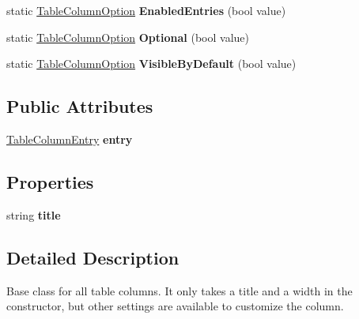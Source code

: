 \begin{DoxyCompactItemize}
\item 
\mbox{\label{class_editor_g_u_i_table_1_1_table_column_a86d1eda120806f1b74c25e01debcd65e}} 
static \mbox{\hyperlink{class_table_column_option}{Table\+Column\+Option}} {\bfseries Enabled\+Entries} (bool value)
\item 
\mbox{\label{class_editor_g_u_i_table_1_1_table_column_ade101144654dfd6c42c5da8b3aa4f633}} 
static \mbox{\hyperlink{class_table_column_option}{Table\+Column\+Option}} {\bfseries Optional} (bool value)
\item 
\mbox{\label{class_editor_g_u_i_table_1_1_table_column_ad19a110c1ba8ba032a0fa8456afd2e2c}} 
static \mbox{\hyperlink{class_table_column_option}{Table\+Column\+Option}} {\bfseries Visible\+By\+Default} (bool value)
\end{DoxyCompactItemize}
\subsection*{Public Attributes}
\begin{DoxyCompactItemize}
\item 
\mbox{\label{class_editor_g_u_i_table_1_1_table_column_a8b0dc515475070913d584c9497007d9b}} 
\mbox{\hyperlink{class_table_column_entry}{Table\+Column\+Entry}} {\bfseries entry}
\end{DoxyCompactItemize}
\subsection*{Properties}
\begin{DoxyCompactItemize}
\item 
\mbox{\label{class_editor_g_u_i_table_1_1_table_column_a8f7eb4ab0c9a938d772953fc4c78b9af}} 
string {\bfseries title}
\end{DoxyCompactItemize}


\subsection{Detailed Description}
Base class for all table columns. It only takes a title and a width in the constructor, but other settings are available to customize the column. 



